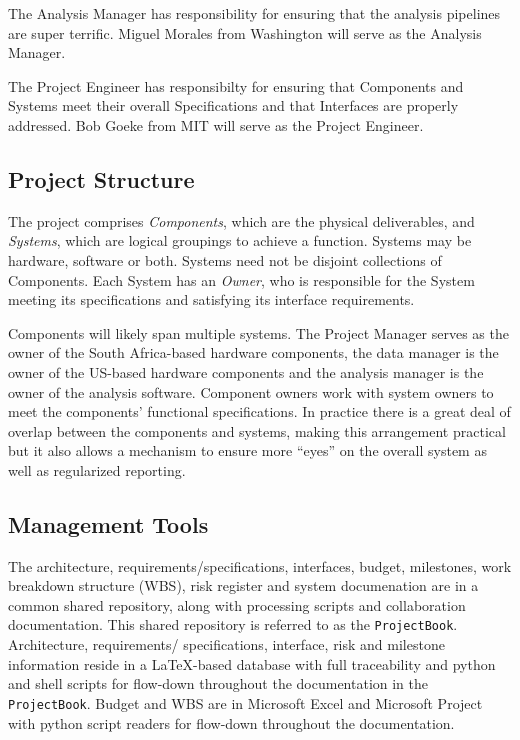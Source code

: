 \documentclass[preprint]{aastex}
\begin{document}
The Analysis Manager has responsibility for ensuring that the analysis pipelines are super terrific.
Miguel Morales from Washington will serve as the Analysis Manager.

The Project Engineer has responsibilty for ensuring that Components and Systems meet their overall
Specifications and that Interfaces are properly addressed.  Bob Goeke from MIT will serve as the
Project Engineer.

\subsection{Project Structure}
The project comprises {\em Components}, which are the physical deliverables, and {\em Systems},
which are logical groupings to achieve a function. Systems may be hardware, software
or both. Systems need not be disjoint collections of Components. Each System has an
{\em Owner}, who is responsible for the System meeting its specifications and satisfying
its interface requirements.

Components will likely span multiple systems. The Project Manager serves as the owner
of the South Africa-based hardware components, the data manager is the owner of the
US-based hardware components and the analysis manager is the owner of the analysis
software. Component owners work with system owners to meet the components' functional
specifications. In practice there is a great deal of overlap between the components
and systems, making this arrangement practical but it also allows a mechanism to
ensure more ``eyes'' on the overall system as well as regularized reporting.

\subsection{Management Tools}
The architecture, requirements/specifications, interfaces, budget, milestones, work
breakdown structure (WBS), risk register and system documenation are in a common
shared repository, along with processing scripts and collaboration documentation.
This shared repository is referred to as the {\tt ProjectBook}. Architecture,
requirements/ specifications, interface, risk and milestone information reside in a
\LaTeX-based database with full traceability and python and shell scripts for
flow-down throughout the documentation in the {\tt ProjectBook}. Budget and WBS are
in Microsoft Excel and Microsoft Project with python script readers for flow-down
throughout the documentation.
\end{document}
